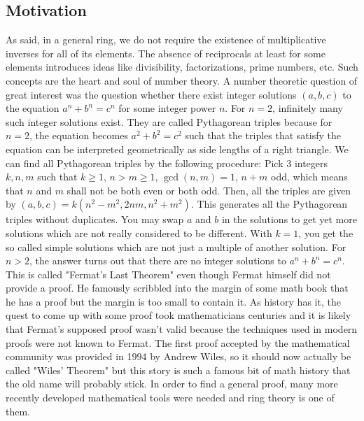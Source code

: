 
\subsection{Motivation}
As said, in a general ring, we do not require the existence of multiplicative inverses for all of its elements. The absence of reciprocals at least for some elements introduces ideas like divisibility, factorizations, prime numbers, etc. Such concepts are the heart and soul of number theory. A number theoretic question of great interest was the question whether there exist integer solutions $(a,b,c)$ to the equation $a^n + b^n = c^n$ for some integer power $n$. For $n=2$, infinitely many such integer solutions exist. They are called Pythagorean triples because for $n=2$, the equation becomes $a^2 + b^2 = c^2$ such that the triples that satisfy the equation can be interpreted geometrically as side lengths of a right triangle. We can find all Pythagorean triples by the following procedure: Pick 3 integers $k,n,m$ such that $k \geq 1$, $n > m \geq 1$, $\gcd(n,m) = 1$, $n + m$ odd, which means that $n$ and $m$ shall not be both even or both odd. Then, all the triples are given by $(a,b,c) = k (n^2 - m^2, 2 n m, n^2 + m^2)$. This generates all the Pythagorean triples without duplicates. You may swap $a$ and $b$ in the solutions to get yet more solutions which are not really considered to be different. With $k=1$, you get the so called simple solutions which are not just a multiple of another solution. For $n > 2$, the answer turns out that there are no integer solutions to $a^n + b^n = c^n$. This is called "Fermat's Last Theorem" even though Fermat himself did not provide a proof. He famously scribbled into the margin of some math book that he has a proof but the margin is too small to contain it. As history has it, the quest to come up with some proof took mathematicians centuries and it is likely that Fermat's supposed proof wasn't valid because the techniques used in modern proofs were not known to Fermat. The first proof accepted by the mathematical community was provided in 1994 by Andrew Wiles, so it should now actually be called "Wiles' Theorem" but this story is such a famous bit of math history that the old name will probably stick. In order to find a general proof, many more recently developed mathematical tools were needed and ring theory is one of them. 

